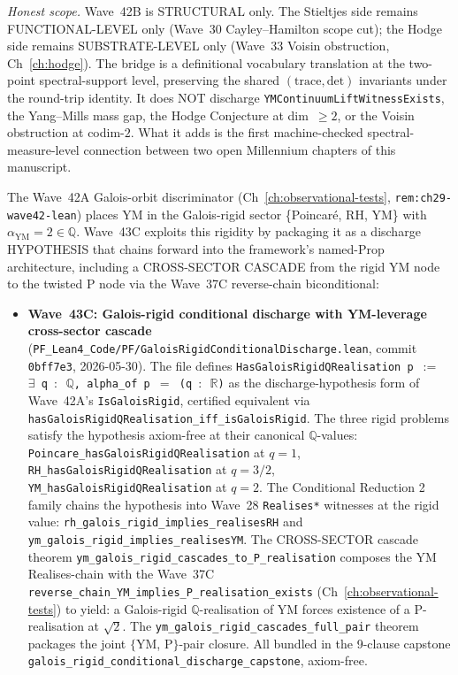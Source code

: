 \begin{remark}
\emph{Honest scope.} Wave~42B is STRUCTURAL only. The Stieltjes side remains FUNCTIONAL-LEVEL only (Wave~30 Cayley--Hamilton scope cut); the Hodge side remains SUBSTRATE-LEVEL only (Wave~33 Voisin obstruction, Ch~\ref{ch:hodge}). The bridge is a definitional vocabulary translation at the two-point spectral-support level, preserving the shared $(\mathrm{trace}, \mathrm{det})$ invariants under the round-trip identity. It does NOT discharge \texttt{YMContinuumLiftWitnessExists}, the Yang--Mills mass gap, the Hodge Conjecture at dim~$\geq 2$, or the Voisin obstruction at codim-$2$. What it adds is the first machine-checked spectral-measure-level connection between two open Millennium chapters of this manuscript.
\end{remark}

\begin{remark}\label{rem:ym-wave43c-lean}
The Wave~42A Galois-orbit discriminator (Ch~\ref{ch:observational-tests}, \texttt{rem:ch29-wave42-lean}) places YM in the Galois-rigid sector \{Poincar\'e, RH, YM\} with $\alpha_{\mathrm{YM}} = 2 \in \mathbb{Q}$. Wave~43C exploits this rigidity by packaging it as a discharge HYPOTHESIS that chains forward into the framework's named-Prop architecture, including a CROSS-SECTOR CASCADE from the rigid YM node to the twisted P node via the Wave~37C reverse-chain biconditional:
\begin{itemize}
  \item \textbf{Wave~43C: Galois-rigid conditional discharge with YM-leverage cross-sector cascade} (\texttt{PF\_Lean4\_Code/PF/GaloisRigidConditionalDischarge.lean}, commit \texttt{0bff7e3}, 2026-05-30). The file defines \texttt{HasGaloisRigidQRealisation p $:=$ $\exists$ q $:$ $\mathbb{Q}$, alpha\_of p $=$ (q $:$ $\mathbb{R}$)} as the discharge-hypothesis form of Wave~42A's \texttt{IsGaloisRigid}, certified equivalent via \texttt{hasGaloisRigidQRealisation\_iff\_isGaloisRigid}. The three rigid problems satisfy the hypothesis axiom-free at their canonical $\mathbb{Q}$-values: \texttt{Poincare\_hasGaloisRigidQRealisation} at $q = 1$, \texttt{RH\_hasGaloisRigidQRealisation} at $q = 3/2$, \texttt{YM\_hasGaloisRigidQRealisation} at $q = 2$. The Conditional Reduction 2 family chains the hypothesis into Wave~28 \texttt{Realises*} witnesses at the rigid value: \texttt{rh\_galois\_rigid\_implies\_realisesRH} and \texttt{ym\_galois\_rigid\_implies\_realisesYM}. The CROSS-SECTOR cascade theorem \texttt{ym\_galois\_rigid\_cascades\_to\_P\_realisation} composes the YM Realises-chain with the Wave~37C \texttt{reverse\_chain\_YM\_implies\_P\_realisation\_exists} (Ch~\ref{ch:observational-tests}) to yield: a Galois-rigid $\mathbb{Q}$-realisation of YM forces existence of a P-realisation at $\sqrt{2}$. The \texttt{ym\_galois\_rigid\_cascades\_full\_pair} theorem packages the joint $\{$YM, P$\}$-pair closure. All bundled in the 9-clause capstone \texttt{galois\_rigid\_conditional\_discharge\_capstone}, axiom-free.

\end{itemize}
\end{remark}
